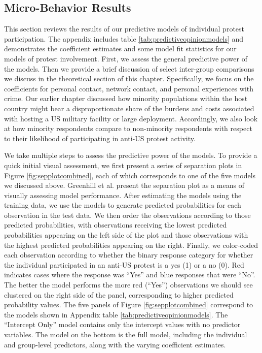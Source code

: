 			\subsection*{Micro-Behavior Results}
			
			This section reviews the results of our predictive models of individual protest participation. The appendix includes table \ref{tab:predictiveopinionmodels} and demonstrates the coefficient estimates and some model fit statistics for our models of protest involvement. First, we assess the general predictive power of the models. Then we provide a brief discussion of select inter-group comparisons we discuss in the theoretical section of this chapter. Specifically, we focus on the coefficients for personal contact, network contact, and personal experiences with crime. Our earlier chapter discussed how minority populations within the host country might bear a disproportionate share of the burdens and costs associated with hosting a US military facility or large deployment. Accordingly, we also look at how minority respondents compare to non-minority respondents with respect to their likelihood of participating in anti-US protest activity.
			
			
			We take multiple steps to assess the predictive power of the models. To provide a quick initial visual assessment, we first present a series of separation plots in Figure \ref{fig:sepplotcombined}, each of which corresponds to one of the five models we discussed above. Greenhill et al. present the separation plot as a means of visually assessing model performance.\cite{GreenhillWardSacks2011} After estimating the models using the training data, we use the models to generate predicted probabilities for each observation in the test data. We then order the observations according to those predicted probabilities, with observations receiving the lowest predicted probabilities appearing on the left side of the plot and those observations with the highest predicted probabilities appearing on the right. Finally, we color-coded each observation according to whether the binary response category for whether the individual participated in an anti-US protest is a yes (1) or a no (0).  Red indicates cases where the response was ``Yes'' and blue responses that were ``No''. The better the model performs the more red (``Yes'') observations we should see clustered on the right side of the panel, corresponding to higher predicted probability values. The five panels of Figure \ref{fig:sepplotcombined} correspond to the models shown in Appendix table \ref{tab:predictiveopinionmodels}. The ``Intercept Only'' model contains only the intercept values with no predictor variables. The model on the bottom is the full model, including the individual and group-level predictors, along with the varying coefficient estimates.
			

